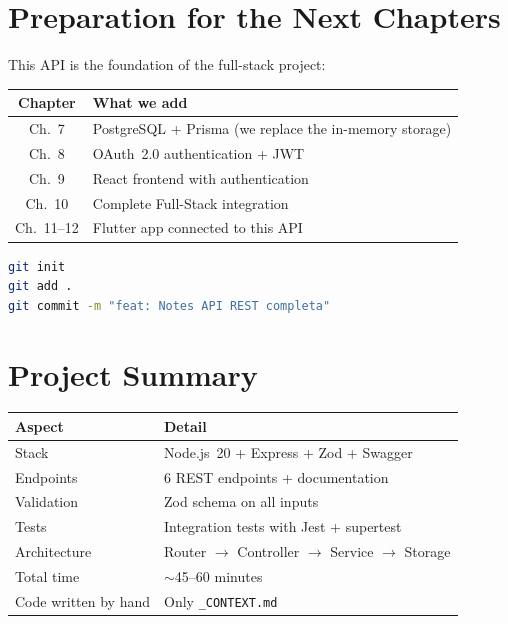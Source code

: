 \section{Preparation for the Next Chapters}

This API is the foundation of the full-stack project:

\begin{center}
\begin{tabularx}{\textwidth}{c X}
\toprule
\textbf{Chapter} & \textbf{What we add} \\
\midrule
Ch.~7 & PostgreSQL + Prisma (we replace the in-memory storage) \\
Ch.~8 & OAuth~2.0 authentication + JWT \\
Ch.~9 & React frontend with authentication \\
Ch.~10 & Complete Full-Stack integration \\
Ch.~11--12 & Flutter app connected to this API \\
\bottomrule
\end{tabularx}
\end{center}

\begin{praticabox}[title={Hands-on --- Initialize Git}]
\begin{lstlisting}[language=bash]
git init
git add .
git commit -m "feat: Notes API REST completa"
\end{lstlisting}
\end{praticabox}

\section*{Project Summary}

\begin{center}
\begin{tabularx}{\textwidth}{l X}
\toprule
\textbf{Aspect} & \textbf{Detail} \\
\midrule
Stack & Node.js~20 + Express + Zod + Swagger \\
Endpoints & 6 REST endpoints + documentation \\
Validation & Zod schema on all inputs \\
Tests & Integration tests with Jest + supertest \\
Architecture & Router $\rightarrow$ Controller $\rightarrow$ Service $\rightarrow$ Storage \\
Total time & $\sim$45--60 minutes \\
Code written by hand & Only \texttt{\_CONTEXT.md} \\
\bottomrule
\end{tabularx}
\end{center}
